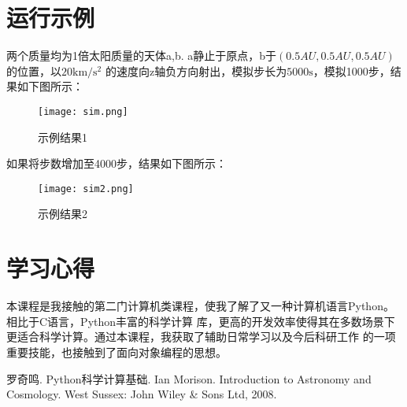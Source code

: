 \documentclass[UTF8]{ctexart}
\begin{document}
\section{运行示例}
两个质量均为1倍太阳质量的天体a,b. a静止于原点，b于$(0.5AU, 0.5AU, 0.5AU)$的位置，以$20\mathrm{km/s^2}$
的速度向z轴负方向射出，模拟步长为$5000\mathrm{s}$，模拟1000步，结果如下图所示：
\begin{figure}[h]
  \centering
  \texttt{[image: sim.png]}
  \caption{示例结果1}
\end{figure}

如果将步数增加至4000步，结果如下图所示：
\begin{figure}[h]
  \centering
  \texttt{[image: sim2.png]}
  \caption{示例结果2}
\end{figure}
\section{学习心得}
本课程是我接触的第二门计算机类课程，使我了解了又一种计算机语言Python。相比于C语言，Python丰富的科学计算
库，更高的开发效率使得其在多数场景下更适合科学计算。通过本课程，我获取了辅助日常学习以及今后科研工作
的一项重要技能，也接触到了面向对象编程的思想。

\begin{thebibliography}{5}
  罗奇鸣. Python科学计算基础.
  Ian Morison. Introduction to Astronomy and Cosmology. West Sussex: John Wiley \& Sons Ltd, 2008.
\end{thebibliography}


\end{document}
